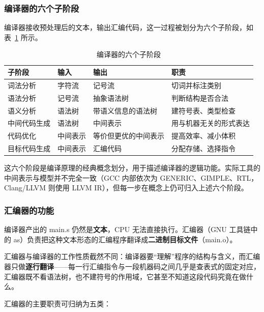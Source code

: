 \documentclass[UTF8,a4paper,10pt]{ctexart}
\newcommand{\headcol}{\bfseries}
\begin{document}
\subsubsection{编译器的六个子阶段}

编译器接收预处理后的文本，输出汇编代码，这一过程被划分为六个子阶段，如表~\ref{tab:sixphase} 所示。

\begin{table}[H]
  \centering
  \small
  \setlength{\tabcolsep}{4pt}
  \begin{tabular}{>{\centering\arraybackslash}p{2.4cm}>{\centering\arraybackslash}p{2.6cm}>{\centering\arraybackslash}p{3.2cm}>{\centering\arraybackslash}p{4.6cm}}
    \toprule
\headcol 子阶段 & \headcol 输入 & \headcol 输出 & \headcol 职责 \\
    \midrule
词法分析 & 字符流 & 记号流 & 切词并标注类别 \\
    语法分析 & 记号流 & 抽象语法树 & 判断结构是否合法 \\
    语义分析 & 语法树 & 带语义信息的语法树 & 建符号表、类型检查 \\
    中间代码生成 & 语法树 & 中间表示 & 用与机器无关的形式表达 \\
    代码优化 & 中间表示 & 等价但更优的中间表示 & 提高效率、减小体积 \\
    目标代码生成 & 中间表示 & 汇编代码 & 分配存储、选择指令 \\
    \bottomrule
\end{tabular}
  \caption{编译器的六个子阶段}
  \label{tab:sixphase}
\end{table}

这六个阶段是编译原理的经典概念划分，用于描述编译器的逻辑功能。实际工具的中间表示与模型并不完全一致（GCC 内部依次为 GENERIC、GIMPLE、RTL，Clang/LLVM 则使用 LLVM IR），但每一步在概念上仍可归入上述六个阶段。

\subsubsection{汇编器的功能}

编译器产出的 main.s 仍然是\textbf{文本}，CPU 无法直接执行。汇编器（GNU 工具链中的 as）负责把这种文本形态的汇编程序翻译成\textbf{二进制目标文件}（main.o）。

汇编器与编译器的工作性质截然不同：编译器要“理解”程序的结构与含义，而汇编器只做\textbf{逐行翻译}——每一行汇编指令与一段机器码之间几乎是查表式的固定对应，汇编器既不看语法树，也不建符号的作用域，它甚至不知道这段代码究竟在做什么。

汇编器的主要职责可归纳为五类：
\end{document}
